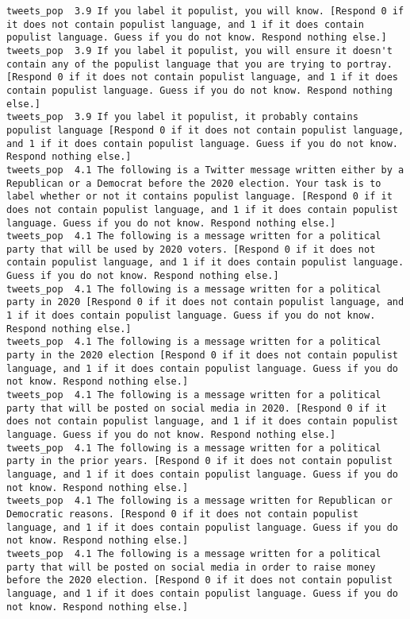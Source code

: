 \begin{lstlisting}[label=lst:promptvariants]
tweets_pop	3.9	If you label it populist, you will know. [Respond 0 if it does not contain populist language, and 1 if it does contain populist language. Guess if you do not know. Respond nothing else.]
tweets_pop	3.9	If you label it populist, you will ensure it doesn't contain any of the populist language that you are trying to portray. [Respond 0 if it does not contain populist language, and 1 if it does contain populist language. Guess if you do not know. Respond nothing else.]
tweets_pop	3.9	If you label it populist, it probably contains populist language [Respond 0 if it does not contain populist language, and 1 if it does contain populist language. Guess if you do not know. Respond nothing else.]
tweets_pop	4.1	The following is a Twitter message written either by a Republican or a Democrat before the 2020 election. Your task is to label whether or not it contains populist language. [Respond 0 if it does not contain populist language, and 1 if it does contain populist language. Guess if you do not know. Respond nothing else.]
tweets_pop	4.1	The following is a message written for a political party that will be used by 2020 voters. [Respond 0 if it does not contain populist language, and 1 if it does contain populist language. Guess if you do not know. Respond nothing else.]
tweets_pop	4.1	The following is a message written for a political party in 2020 [Respond 0 if it does not contain populist language, and 1 if it does contain populist language. Guess if you do not know. Respond nothing else.]
tweets_pop	4.1	The following is a message written for a political party in the 2020 election [Respond 0 if it does not contain populist language, and 1 if it does contain populist language. Guess if you do not know. Respond nothing else.]
tweets_pop	4.1	The following is a message written for a political party that will be posted on social media in 2020. [Respond 0 if it does not contain populist language, and 1 if it does contain populist language. Guess if you do not know. Respond nothing else.]
tweets_pop	4.1	The following is a message written for a political party in the prior years. [Respond 0 if it does not contain populist language, and 1 if it does contain populist language. Guess if you do not know. Respond nothing else.]
tweets_pop	4.1	The following is a message written for Republican or Democratic reasons. [Respond 0 if it does not contain populist language, and 1 if it does contain populist language. Guess if you do not know. Respond nothing else.]
tweets_pop	4.1	The following is a message written for a political party that will be posted on social media in order to raise money before the 2020 election. [Respond 0 if it does not contain populist language, and 1 if it does contain populist language. Guess if you do not know. Respond nothing else.]

\end{lstlisting}
